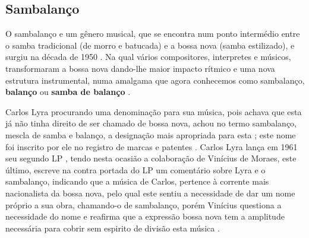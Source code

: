 \subsection{Sambalanço}
\label{ref:sambalanco}
O sambalanço e um gênero musical,
que se encontra num ponto intermédio entre o samba tradicional (de morro e batucada)
e a bossa nova (samba estilizado), e surgiu na década de 1950 \cite[pp. 119]{diniz2008almanaque}.
Na qual vários compositores, interpretes e músicos, 
transformaram a bossa nova dando-lhe maior impacto rítmico e uma nova estrutura instrumental,
numa amalgama que agora conhecemos como sambalanço, \textbf{balanço} ou \textbf{samba de balanço} \cite{de2017sambalanco}.

Carlos Lyra procurando uma denominação para sua música, 
pois achava que esta já não tinha direito de ser chamado de bossa nova,
achou no termo sambalanço, mescla de samba e balanço, a designação mais apropriada para esta \cite{castro2011bossa};
este nome foi inscrito por ele no registro de marcas e patentes \cite[pp. 127]{vianna1999bezerra} \cite{castro2011bossa}.
Carlos Lyra lança em 1961  seu segundo LP \cite[pp. 142]{lyrasongbook}  \cite{castro2011bossa}, 
tendo nesta ocasião a colaboração de Vinícius de Moraes,
este último, escreve na contra portada do LP um comentário sobre Lyra e o sambalanço,
indicando que a música de Carlos, pertence à corrente mais nacionalista da bossa nova,
pelo qual este sentiu a necessidade de dar um nome próprio a sua obra, 
chamando-o de sambalanço, 
porém Vinícius questiona a necessidade do nome e reafirma que a expressão 
 bossa nova tem a amplitude necessária para cobrir sem espirito de divisão esta música \cite{castro2011bossa}.

